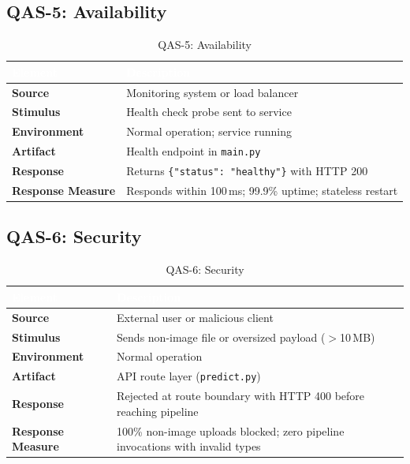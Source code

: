 \documentclass[11pt,a4paper,oneside]{report}
\newcommand{\file}[1]{\texttt{\footnotesize #1}}
\newcommand{\code}[1]{\texttt{\footnotesize #1}}
\begin{document}
\subsection{QAS-5: Availability}
\begin{table}[H]
\centering\footnotesize
\caption{QAS-5: Availability}
\label{tab:qas-avail}
\begin{tabularx}{\textwidth}{>{\bfseries}p{2.5cm} X}
\toprule
\rowcolor{tableheader}
\textcolor{white}{Element} & \textcolor{white}{Description} \\
\midrule
Source          & Monitoring system or load balancer \\
Stimulus        & Health check probe sent to service \\
Environment     & Normal operation; service running \\
Artifact        & Health endpoint in \file{main.py} \\
Response        & Returns \code{\{"status": "healthy"\}} with HTTP 200 \\
Response Measure & Responds within 100\,ms; 99.9\% uptime; stateless restart \\
\bottomrule
\end{tabularx}
\end{table}

\subsection{QAS-6: Security}
\begin{table}[H]
\centering\footnotesize
\caption{QAS-6: Security}
\label{tab:qas-sec}
\begin{tabularx}{\textwidth}{>{\bfseries}p{2.5cm} X}
\toprule
\rowcolor{tableheader}
\textcolor{white}{Element} & \textcolor{white}{Description} \\
\midrule
Source          & External user or malicious client \\
Stimulus        & Sends non-image file or oversized payload ($>$10\,MB) \\
Environment     & Normal operation \\
Artifact        & API route layer (\file{predict.py}) \\
Response        & Rejected at route boundary with HTTP 400 before reaching pipeline \\
Response Measure & 100\% non-image uploads blocked; zero pipeline invocations with invalid types \\
\bottomrule
\end{tabularx}
\end{table}
\end{document}
